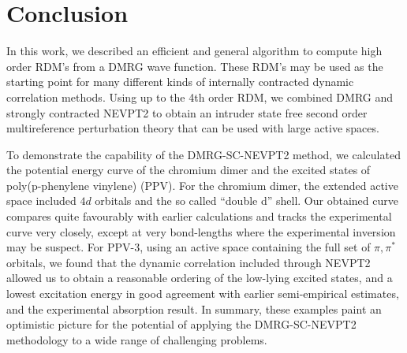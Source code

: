 
\section{Conclusion}

In this work, we described an efficient and general algorithm to compute high order RDM's from a DMRG wave function.
These RDM's may be used as the starting point for many
different kinds of internally contracted dynamic correlation methods.
Using up to the 4th order RDM, we combined DMRG and strongly contracted NEVPT2 to obtain
an intruder state free second order multireference perturbation theory that can be used with large active spaces.

To demonstrate the capability of the DMRG-SC-NEVPT2 method, we calculated the potential energy curve of the chromium dimer and the excited 
states of poly(p-phenylene vinylene) (PPV). For the chromium dimer, the extended active space included $4d$ orbitals and the so called ``double d'' shell.
Our obtained curve compares quite favourably with earlier calculations and tracks the experimental curve very closely, except
at very bond-lengths where the experimental inversion may be suspect.
For PPV-3, using an active space containing the full set of $\pi, \pi^*$ orbitals, we found that the dynamic correlation included through NEVPT2 allowed us to obtain
a reasonable ordering of the low-lying excited states, and a lowest excitation energy in good agreement with earlier semi-empirical estimates, and
the experimental absorption result. In summary, these examples paint an optimistic picture for the potential of applying the
DMRG-SC-NEVPT2 methodology to a wide range of challenging problems.
